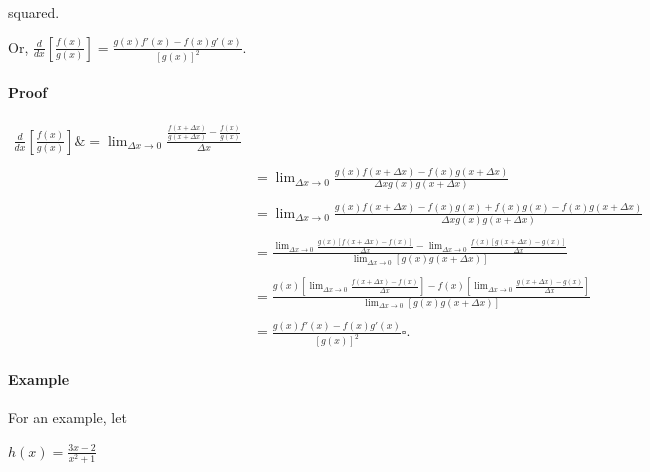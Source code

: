 {{{{squared.



Or, $\frac{d}{dx} \left[\frac{f(x)}{g(x)}\right] = \frac{g(x)f'(x) - f(x)g'(x)}{[g(x)]^2}.$



\paragraph{Proof}



$\begin{aligned}

\frac{d}{dx} \left[\frac{f(x)}{g(x)}\right] \&= \lim_{{\Delta}x\rightarrow 0} \frac {\frac {f(x + {\Delta}x)}{g(x + {\Delta}x)} - \frac {f(x)}{g(x)}}{{\Delta}x} \\\\&= \lim_{{\Delta}x\rightarrow 0} \frac {g(x)f(x + {\Delta}x) - f(x)g(x + {\Delta}x)}{{\Delta}xg(x)g(x + {\Delta}x)} \\\\&= \lim_{{\Delta}x\rightarrow 0} \frac {g(x)f(x + {\Delta}x) - f(x)g(x) + f(x)g(x) - f(x)g(x + {\Delta}x)}{{\Delta}xg(x)g(x + {\Delta}x)} \\\\&= \frac {\lim_{{\Delta}x\rightarrow 0} \frac {g(x)[f(x + {\Delta}x) - f(x)]}{{\Delta}x} - \lim_{{\Delta}x\rightarrow 0} \frac {f(x)[g(x + {\Delta}x) - g(x)]}{{\Delta}x}}{\lim_{{\Delta}x\rightarrow 0}  [g(x)g(x + {\Delta}x)]} \\\\&= \frac {g(x)[\lim_{{\Delta}x\rightarrow 0} \frac {f(x + {\Delta}x) - f(x)}{{\Delta}x}] - f(x)[\lim_{{\Delta}x\rightarrow 0} \frac {g(x + {\Delta}x) - g(x)}{{\Delta}x}]}{\lim_{{\Delta}x\rightarrow 0}[g(x)g(x + {\Delta}x)]} \\\\&= \frac {g(x)f'(x) - f(x)g'(x)}{[g(x)]^2} {\square}.

\end{aligned}$



\paragraph{Example}



For an example, let



$h(x) = \frac {3x - 2}{x^2 + 1}$



}}}}
